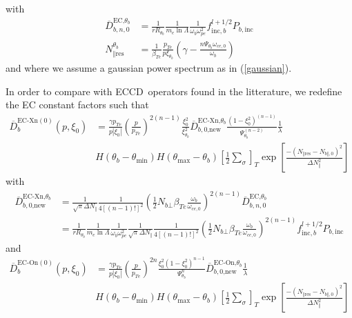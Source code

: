 with
\begin{align}
\overline{D}_{b,n,0}^{\text{EC,}\theta_{b}} &  =\frac{1}{rR_{\theta_{b}}}%
\frac{1}{m_{e}\ln\Lambda}\frac{1}{\omega_{b}\omega_{pe}^{2}}f_{\text{inc}%
,b}^{l+1/2}P_{b,\text{inc}}\\
N_{\Vert\text{res}}^{\theta_{b}} &  =\frac{1}{\beta_{Te}}\frac{p_{Te}}%
{p\xi_{\theta_{b}}}\left(  \gamma-\frac{n\Psi_{\theta_{b}}\omega_{ce,0}%
}{\omega_{b}}\right)
\end{align}
and where we assume a gaussian power spectrum as in (\ref{gaussian}).

In order to compare with ECCD\ operators found in the litterature, we redefine
the EC constant factors such that%
\begin{align}
\overline{D}_{b}^{\text{EC-Xn}(0)}(p,\xi_{0}) &  =\frac{\gamma p_{Te}%
}{p\left|  \xi_{0}\right|  }\left(  \frac{p}{p_{Te}}\right)  ^{2\left(
n-1\right)  }\frac{\xi_{0}^{2}}{\xi_{\theta_{b}}^{2}}\overline{D}%
_{b,0\text{,new}}^{\text{EC-Xn,}\theta_{b}}\frac{\left(  1-\xi_{0}^{2}\right)
^{\left(  n-1\right)  }}{\Psi_{\theta_{b}}^{\left(  n-2\right)  }}\frac
{1}{\lambda}\nonumber\\
&  H\left(  \theta_{b}-\theta_{\min}\right)  H\left(  \theta_{\max}-\theta
_{b}\right)  \left[  \frac{1}{2}\sum\limits_{\sigma}\right]  _{T}\exp\left[
\frac{-\left(  N_{\Vert\text{res}}-N_{b\Vert,0}\right)  ^{2}}{\Delta N_{\Vert
}^{2}}\right]
\end{align}
with
\begin{align}
\overline{D}_{b,0\text{,new}}^{\text{EC-Xn,}\theta_{b}} &  =\frac{1}{\sqrt
{\pi}\Delta N_{\Vert}}\frac{1}{4\left[  \left(  n-1\right)  !\right]  ^{2}%
}\left(  \frac{1}{2}N_{b\bot}\beta_{Te}\frac{\omega_{b}}{\omega_{ce,0}%
}\right)  ^{2\left(  n-1\right)  }\overline{D}_{b,n,0}^{\text{EC,}\theta_{b}%
}\\
&  =\frac{1}{rR_{\theta_{b}}}\frac{1}{m_{e}\ln\Lambda}\frac{1}{\omega
_{b}\omega_{pe}^{2}}\frac{1}{\sqrt{\pi}\Delta N_{\Vert}}\frac{1}{4\left[
\left(  n-1\right)  !\right]  ^{2}}\left(  \frac{1}{2}N_{b\bot}\beta_{Te}%
\frac{\omega_{b}}{\omega_{ce,0}}\right)  ^{2\left(  n-1\right)  }%
f_{\text{inc},b}^{l+1/2}P_{b,\text{inc}}%
\end{align}
and%
\begin{align}
\overline{D}_{b}^{\text{EC-On}(0)}(p,\xi_{0}) &  =\frac{\gamma p_{Te}%
}{p\left|  \xi_{0}\right|  }\left(  \frac{p}{p_{Te}}\right)  ^{2n}\frac
{\xi_{0}^{2}\left(  1-\xi_{0}^{2}\right)  ^{n-1}}{\Psi_{\theta_{b}}^{n}%
}\overline{D}_{b,0\text{,new}}^{\text{EC-On,}\theta_{b}}\frac{1}{\lambda
}\nonumber\\
&  H\left(  \theta_{b}-\theta_{\min}\right)  H\left(  \theta_{\max}-\theta
_{b}\right)  \left[  \frac{1}{2}\sum\limits_{\sigma}\right]  _{T}\exp\left[
\frac{-\left(  N_{\Vert\text{res}}-N_{b\Vert,0}\right)  ^{2}}{\Delta N_{\Vert
}^{2}}\right]
\end{align}

